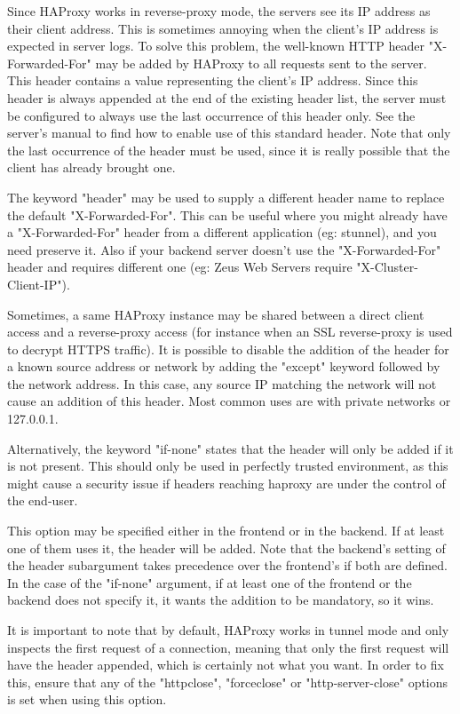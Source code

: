   Since HAProxy works in reverse-proxy mode, the servers see its IP address as
  their client address. This is sometimes annoying when the client's IP address
  is expected in server logs. To solve this problem, the well-known HTTP header
  "X-Forwarded-For" may be added by HAProxy to all requests sent to the server.
  This header contains a value representing the client's IP address. Since this
  header is always appended at the end of the existing header list, the server
  must be configured to always use the last occurrence of this header only. See
  the server's manual to find how to enable use of this standard header. Note
  that only the last occurrence of the header must be used, since it is really
  possible that the client has already brought one.

  The keyword "header" may be used to supply a different header name to replace
  the default "X-Forwarded-For". This can be useful where you might already
  have a "X-Forwarded-For" header from a different application (eg: stunnel),
  and you need preserve it. Also if your backend server doesn't use the
  "X-Forwarded-For" header and requires different one (eg: Zeus Web Servers
  require "X-Cluster-Client-IP").

  Sometimes, a same HAProxy instance may be shared between a direct client
  access and a reverse-proxy access (for instance when an SSL reverse-proxy is
  used to decrypt HTTPS traffic). It is possible to disable the addition of the
  header for a known source address or network by adding the "except" keyword
  followed by the network address. In this case, any source IP matching the
  network will not cause an addition of this header. Most common uses are with
  private networks or 127.0.0.1.

  Alternatively, the keyword "if-none" states that the header will only be
  added if it is not present. This should only be used in perfectly trusted
  environment, as this might cause a security issue if headers reaching haproxy
  are under the control of the end-user.

  This option may be specified either in the frontend or in the backend. If at
  least one of them uses it, the header will be added. Note that the backend's
  setting of the header subargument takes precedence over the frontend's if
  both are defined. In the case of the "if-none" argument, if at least one of
  the frontend or the backend does not specify it, it wants the addition to be
  mandatory, so it wins.

  It is important to note that by default, HAProxy works in tunnel mode and
  only inspects the first request of a connection, meaning that only the first
  request will have the header appended, which is certainly not what you want.
  In order to fix this, ensure that any of the "httpclose", "forceclose" or
  "http-server-close" options is set when using this option.

